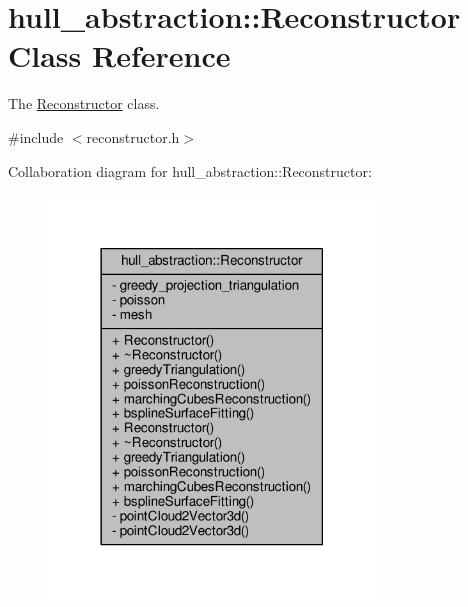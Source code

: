 \hypertarget{classhull__abstraction_1_1_reconstructor}{}\section{hull\+\_\+abstraction\+:\+:Reconstructor Class Reference}
\label{classhull__abstraction_1_1_reconstructor}


The \hyperlink{classhull__abstraction_1_1_reconstructor}{Reconstructor} class.  




{\ttfamily \#include $<$reconstructor.\+h$>$}



Collaboration diagram for hull\+\_\+abstraction\+:\+:Reconstructor\+:
\nopagebreak
\begin{figure}[H]
\begin{center}
\leavevmode
\includegraphics[width=246pt]{classhull__abstraction_1_1_reconstructor__coll__graph}
\end{center}
\end{figure}
